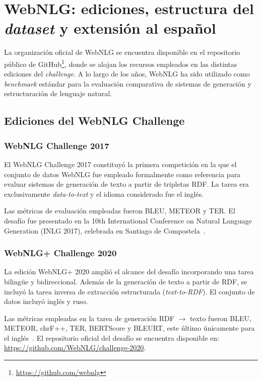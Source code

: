 \chapter{WebNLG: ediciones, estructura del \textit{dataset} y extensión al español} \label{cha:webnlg-desarrollo}

La organización oficial de WebNLG se encuentra disponible en el repositorio
público de GitHub\footnote{\url{https://github.com/webnlg}}, donde se alojan
los recursos empleados en las distintas ediciones del \textit{challenge}. A lo
largo de los años, WebNLG ha sido utilizado como \textit{benchmark} estándar
para la evaluación comparativa de sistemas de generación y estructuración de
lenguaje natural.

\section{Ediciones del WebNLG Challenge}

\subsection{WebNLG Challenge 2017}

El WebNLG Challenge 2017 constituyó la primera competición en la que el
conjunto de datos WebNLG fue empleado formalmente como referencia para evaluar
sistemas de generación de texto a partir de tripletas RDF. La tarea era
exclusivamente \textit{data-to-text} y el idioma considerado fue el inglés.

Las métricas de evaluación empleadas fueron BLEU, METEOR y TER. El desafío fue
presentado en la 10th International Conference on Natural Language Generation
(INLG 2017), celebrada en Santiago de Compostela~\cite{Gardent2017}.

\subsection{WebNLG+ Challenge 2020}

La edición WebNLG+ 2020 amplió el alcance del desafío incorporando una tarea
bilingüe y bidireccional. Además de la generación de texto a partir de RDF, se
incluyó la tarea inversa de extracción estructurada (\textit{text-to-RDF}). El
conjunto de datos incluyó inglés y ruso.

Las métricas empleadas en la tarea de generación RDF $\rightarrow$ texto fueron
BLEU, METEOR, chrF++, TER, BERTScore y BLEURT, este último únicamente para el
inglés~\cite{CastroFerreira2020}. El repositorio oficial del desafío se
encuentra disponible en: \url{https://github.com/WebNLG/challenge-2020}.

